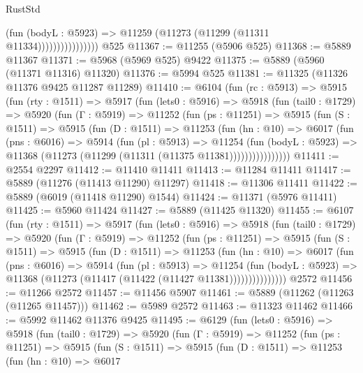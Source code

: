 \begin{lexlean}{RustStd}
\begin{coremodule}
                            (fun (bodyL : @5923) =>
                            @11259 (@11273 (@11299 (@11311 @11334))))))))))))))))
    @525
@11367 := @11255 (@5906 @525)
@11368 := @5889 @11367
@11371 := @5968 (@5969 @525) @9422
@11375 := @5889 (@5960 (@11371 @11316) @11320)
@11376 := @5994 @525
@11381 := @11325 (@11326 @11376 @9425 @11287 @11289)
@11410 := @6104
    (fun (rc : @5913) =>
    @5915
      (fun (rty : @1511) =>
      @5917
        (fun (lets0 : @5916) =>
        @5918
          (fun (tail0 : @1729) =>
          @5920
            (fun (Γ : @5919) =>
            @11252
              (fun (ps : @11251) =>
              @5915
                (fun (S : @1511) =>
                @5915
                  (fun (D : @1511) =>
                  @11253
                    (fun (hn : @10) =>
                    @6017
                      (fun (pns : @6016) =>
                      @5914
                        (fun (pl : @5913) =>
                        @11254
                          (fun (bodyL : @5923) =>
                          @11368 (@11273 (@11299 (@11311 (@11375 @11381))))))))))))))))
@11411 := @2554 @2297
@11412 := @11410 @11411
@11413 := @11284 @11411
@11417 := @5889 (@11276 (@11413 @11290) @11297)
@11418 := @11306 @11411
@11422 := @5889 (@6019 (@11418 @11290) @1544)
@11424 := @11371 (@5976 @11411)
@11425 := @5960 @11424
@11427 := @5889 (@11425 @11320)
@11455 := @6107
    (fun (rty : @1511) =>
    @5917
      (fun (lets0 : @5916) =>
      @5918
        (fun (tail0 : @1729) =>
        @5920
          (fun (Γ : @5919) =>
          @11252
            (fun (ps : @11251) =>
            @5915
              (fun (S : @1511) =>
              @5915
                (fun (D : @1511) =>
                @11253
                  (fun (hn : @10) =>
                  @6017
                    (fun (pns : @6016) =>
                    @5914
                      (fun (pl : @5913) =>
                      @11254
                        (fun (bodyL : @5923) =>
                        @11368 (@11273 (@11417 (@11422 (@11427 @11381)))))))))))))))
    @2572
@11456 := @11266 @2572
@11457 := @11456 @5907
@11461 := @5889 (@11262 (@11263 (@11265 @11457)))
@11462 := @5989 @2572
@11463 := @11323 @11462
@11466 := @5992 @11462 @11376 @9425
@11495 := @6129
    (fun (lets0 : @5916) =>
    @5918
      (fun (tail0 : @1729) =>
      @5920
        (fun (Γ : @5919) =>
        @11252
          (fun (ps : @11251) =>
          @5915
            (fun (S : @1511) =>
            @5915
              (fun (D : @1511) =>
              @11253
                (fun (hn : @10) =>
                @6017

\end{coremodule}
\end{lexlean}
